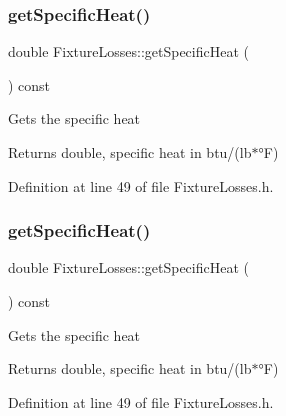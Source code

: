\mbox{\label{class_fixture_losses_adb3ea84a757bac31c52784cdd15349ea}} 
\subsubsection{\texorpdfstring{get\+Specific\+Heat()}{getSpecificHeat()}\hspace{0.1cm}{\footnotesize\ttfamily [1/3]}}
{\footnotesize\ttfamily double Fixture\+Losses\+::get\+Specific\+Heat (\begin{DoxyParamCaption}{ }\end{DoxyParamCaption}) const\hspace{0.3cm}{\ttfamily [inline]}}

Gets the specific heat \begin{DoxyReturn}{Returns}
double, specific heat in btu/(lb$\ast$°F) 
\end{DoxyReturn}


Definition at line 49 of file Fixture\+Losses.\+h.

\mbox{\label{class_fixture_losses_adb3ea84a757bac31c52784cdd15349ea}} 
\subsubsection{\texorpdfstring{get\+Specific\+Heat()}{getSpecificHeat()}\hspace{0.1cm}{\footnotesize\ttfamily [2/3]}}
{\footnotesize\ttfamily double Fixture\+Losses\+::get\+Specific\+Heat (\begin{DoxyParamCaption}{ }\end{DoxyParamCaption}) const\hspace{0.3cm}{\ttfamily [inline]}}

Gets the specific heat \begin{DoxyReturn}{Returns}
double, specific heat in btu/(lb$\ast$°F) 
\end{DoxyReturn}


Definition at line 49 of file Fixture\+Losses.\+h.

\mbox{\label{class_fixture_losses_adb3ea84a757bac31c52784cdd15349ea}} 
